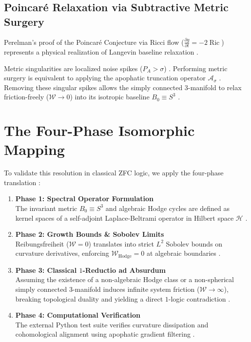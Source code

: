 \documentclass[11pt,a4paper]{article}
\begin{document}
\subsection{Poincaré Relaxation via Subtractive Metric Surgery}
Perelman's proof of the Poincaré Conjecture \cite{poincare1904cinquieme} via Ricci flow ($\frac{\partial g}{\partial t} = -2 \operatorname{Ric}$) \cite{hamilton1982three, perelman2002entropy} represents a physical realization of Langevin baseline relaxation \cite{langevin1908, nicht_physics_paper_3}. 

Metric singularities are localized noise spikes ($P_A > \sigma$) \cite{nicht_physics_paper_2}. Performing metric surgery is equivalent to applying the apophatic truncation operator $\mathcal{A}_\sigma$ \cite{nicht_physics_special_1, nicht_physics_paper_4}. Removing these singular spikes allows the simply connected 3-manifold to relax friction-freely ($\mathcal{W} \to 0$) into its isotropic baseline $B_0 \equiv S^3$ \cite{dedekind1872stetigkeit, wittgenstein1922tractatus}.

\section{The Four-Phase Isomorphic Mapping}
To validate this resolution in classical ZFC logic, we apply the four-phase translation \cite{nicht_metaphysics_paper_0}:

\begin{enumerate}
    \item \textbf{Phase 1: Spectral Operator Formulation} \\
    The invariant metric $B_0 \equiv S^3$ and algebraic Hodge cycles are defined as kernel spaces of a self-adjoint Laplace-Beltrami operator in Hilbert space $\mathcal{H}$ \cite{hilbert1912, hodge1950topological}.
    
    \item \textbf{Phase 2: Growth Bounds \& Sobolev Limits} \\
    Reibungsfreiheit ($\mathcal{W} = 0$) translates into strict $L^2$ Sobolev bounds on curvature derivatives, enforcing $\mathcal{W}_{\text{Hodge}} = 0$ at algebraic boundaries \cite{riemann1859ueber, leray1934mouvement, fefferman2006existence}.
    
    \item \textbf{Phase 3: Classical $1$-Reductio ad Absurdum} \\
    Assuming the existence of a non-algebraic Hodge class \cite{hodge1950topological} or a non-spherical simply connected 3-manifold \cite{poincare1904cinquieme} induces infinite system friction ($\mathcal{W} \to \infty$), breaking topological duality and yielding a direct $1$-logic contradiction \cite{godel1931formal, tarski1936begriff}.
    
    \item \textbf{Phase 4: Computational Verification} \\
    The external Python test suite verifies curvature dissipation and cohomological alignment using apophatic gradient filtering \cite{cook1971complexity, davis1962machine, apophatic_opt_pypi}.
\end{enumerate}
\end{document}
